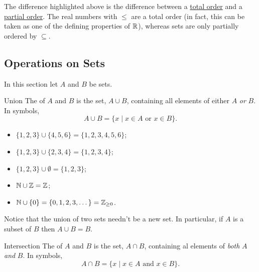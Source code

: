 \documentclass[fleqn]{LectureClass/LectureClass}
\begin{document}
    \begin{remark}{}{}
        The difference highlighted above is the difference between a \href{https://en.wikipedia.org/wiki/Total_order}{total order} and a \href{https://en.wikipedia.org/wiki/Partially_ordered_set}{partial order}.
        The real numbers with \(\le\) are a total order (in fact, this can be taken as one of the defining properties of \(\mathbb{R}\)), whereas sets are only partially ordered by \(\subseteq\).
    \end{remark}
    
    \subsection{Operations on Sets}
    In this section let \(A\) and \(B\) be sets.
    
    \begin{dfn}{Union}{}
        The  of \(A\) and \(B\) is the set, \(A \cup B\), containing all elements of either \(A\) \emph{or} \(B\).
        In symbols,
        \begin{equation}
            A \cup B = \{x \mid x \in A \text{ or } x \in B\}.
        \end{equation}
    \end{dfn}
    
    \begin{exm}{}{}
        \begin{itemize}
            \item \(\{1, 2, 3\} \cup \{4, 5, 6\} = \{1, 2, 3, 4, 5, 6\}\);
            \item \(\{1, 2, 3\} \cup \{2, 3, 4\} = \{1, 2, 3, 4\}\);
            \item \(\{1, 2, 3\} \cup \emptyset = \{1, 2, 3\}\);
            \item \(\mathbb{N} \cup \mathbb{Z} = \mathbb{Z}\);
            \item \(\mathbb{N} \cup \{0\} = \{0, 1, 2, 3, \dotsc\} = \mathbb{Z}_{\ge 0}\).
        \end{itemize}
    \end{exm}
    
    Notice that the union of two sets needn't be a new set.
    In particular, if \(A\) is a subset of \(B\) then \(A \cup B = B\).
    
    \begin{dfn}{Intersection}{}
        The  of \(A\) and \(B\) is the set, \({A \cap B}\), containing al elements of \emph{both} \(A\) \emph{and} \(B\).
        In symbols,
        \begin{equation}
            A \cap B = \{x \mid x \in A \text{ and } x \in B\}.
        \end{equation}
    \end{dfn}
    
\end{document}
